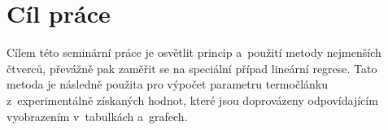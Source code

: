 \section{Cíl práce}
Cílem této seminární práce je osvětlit princip a~použití metody nejmenších
čtverců, převážně pak zaměřit se na speciální případ lineární regrese. Tato
metoda je následně použita pro výpočet parametru termočlánku z~experimentálně
získaných hodnot, které jsou doprovázeny odpovídajícím vyobrazením v~tabulkách
a~grafech. 

